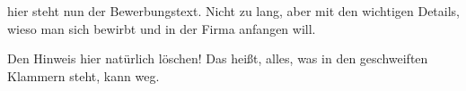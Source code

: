 \documentclass[12pt,parskip=half-]{scrartcl}
\begin{document}





\begin{Anschreiben}
    hier steht nun der Bewerbungstext. Nicht zu lang, aber mit den
    wichtigen Details, wieso man sich bewirbt und in der Firma
    anfangen will.
    
    Den Hinweis hier natürlich löschen! Das heißt, alles, was in
    den geschweiften Klammern steht, kann weg.
\end{Anschreiben}

\end{document}
